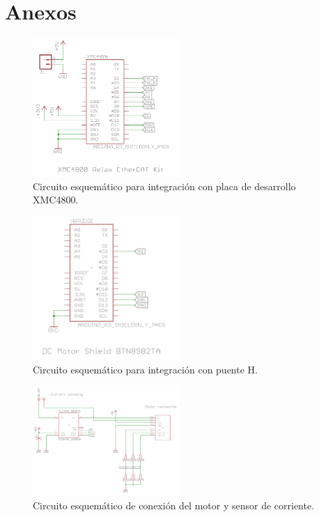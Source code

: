 \chapter{Anexos}

\begin{figure}[ht]
  \centering
  \includegraphics[width=0.5\textwidth]{img/anexo/xmc4800_schematic}
  \caption{Circuito esquemático para integración con placa de desarrollo XMC4800.}
  \label{anexo_esq_xmc4800}
\end{figure}

\begin{figure}[ht]
  \centering
  \includegraphics[width=0.5\textwidth]{img/anexo/puente_h_schematic}
  \caption{Circuito esquemático para integración con puente H.}
  \label{anexo_esq_puente_h}
\end{figure}


\begin{figure}[ht]
  \centering
  \includegraphics[width=0.5\textwidth]{img/anexo/current_sensor_schematic}
  \caption{Circuito esquemático de conexión del motor y sensor de corriente.}
  \label{anexo_esq_motor}
\end{figure}


